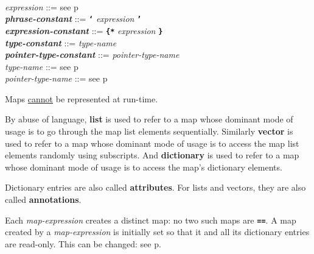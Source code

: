 \documentclass[12pt]{article}
\newcommand{\TT}[1]{{\tt \bfseries #1}}
\newcommand{\key}[1]{{\rm \bfseries #1}}
\newcommand{\emkey}[1]{{\em \bfseries #1}}
\newcommand{\skey}[2]{{\rm \bfseries #1#2}}
\newcommand{\pagref}[1]{p\pageref{#1}}
\newenvironment{indpar}[1][0.3in]%
	{\begin{list}{}%
		     {\setlength{\itemsep}{0in}%
		      \setlength{\topsep}{0in}%
		      \setlength{\parsep}{1ex}%
		      \setlength{\labelwidth}{#1}%
		      \setlength{\leftmargin}{#1}%
		      \addtolength{\leftmargin}{\labelsep}}%
	 \item}%
	{\end{list}}
\begin{document}
\begin{indpar}
\\[0.5ex]
{\em expression} ::= see \pagref{EXPRESSION}
\\[0.5ex]
\emkey{phrase-constant} ::= \TT{`} {\em expression} \TT{'}
\\[0.5ex]
\emkey{expression-constant} ::= \TT{\{*} {\em expression} \TT{*\}}
\\[0.5ex]
\emkey{type-constant} ::= {\em type-name}
\\[0.5ex]
\emkey{pointer-type-constant} ::= {\em pointer-type-name}
\\[0.5ex]
{\em type-name} ::= see \pagref{TYPE-NAME}
\\[0.5ex]
{\em pointer-type-name} ::= see \pagref{POINTER-TYPE-NAME}
\end{indpar}

Maps \underline{cannot} be represented at run-time.

By abuse of language, \key{list} is used to refer to a map whose
dominant mode of usage is to go through the map list elements
sequentially.  Similarly \key{vector} is used to refer to a map whose
dominant mode of usage is to access the map list elements randomly
using subscripts.  And \key{dictionary} is used to refer to a map
whose dominant mode of usage is to access the map's dictionary elements.

Dictionary entries are also called \skey{attribute}s.  For lists and
vectors, they are also called \skey{annotation}s.

Each {\em map-expression}
creates a distinct map: no two such maps are \TT{==}.  A map created
by a {\em map-expression} is initially set so that it and all its dictionary
entries are read-only.  This can be changed: see \pagref{READ-ONLY-MAP}.
\end{document}
